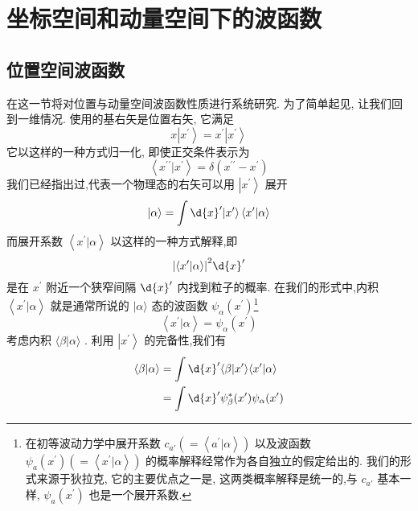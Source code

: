 \documentclass[lang=cn,newtx,10pt,scheme=chinese,thmcnt=section]{elegantbook}
\begin{document}
\section{坐标空间和动量空间下的波函数}
\subsection*{位置空间波函数}
在这一节将对位置与动量空间波函数性质进行系统研究. 为了简单起见, 让我们回到一维情况. 使用的基右矢是位置右矢, 它满足
\begin{equation}
	x\left| {x}^{\prime }\right\rangle = {x}^{\prime }\left| {x}^{\prime }\right\rangle
\end{equation}
它以这样的一种方式归一化, 即使正交条件表示为
\begin{equation}
	\left\langle {{x}^{\prime \prime } | {x}^{\prime }}\right\rangle = \delta \left( {{x}^{\prime \prime } - {x}^{\prime }}\right)
\end{equation}
我们已经指出过,代表一个物理态的右矢可以用 $\left| {x}^{\prime }\right\rangle$ 展开
\begin{equation}
	| {\alpha \rangle = \int \d{x}^{\prime }}| {x}^{\prime }\rangle \left\langle {{x}^{\prime } | \alpha }\right\rangle
\end{equation}
而展开系数 $\left\langle {{x}^{\prime } | \alpha }\right\rangle$ 以这样的一种方式解释,即
\begin{equation}
	{\left| \left\langle {x}^{\prime } | \alpha \right\rangle \right| }^{2}\d{x}^{\prime }
\end{equation}
是在 ${x}^{\prime }$ 附近一个狭窄间隔 $\d{x}^{\prime }$ 内找到粒子的概率. 在我们的形式中,内积 $\left\langle {{x}^{\prime } | \alpha }\right\rangle$ 就是通常所说的 $|\alpha \rangle$ 态的波函数 ${\psi }_{\alpha }\left( {x}^{\prime }\right)$\footnote{在初等波动力学中展开系数 ${c}_{a'}\left( { = \left\langle {{a}^{\prime } | \alpha }\right\rangle }\right)$ 以及波函数 ${\psi }_{a}\left( {x}^{\prime }\right) \left( { = \left\langle {{x}^{\prime } | \alpha }\right\rangle }\right)$ 的概率解释经常作为各自独立的假定给出的. 我们的形式来源于狄拉克, 它的主要优点之一是, 这两类概率解释是统一的,与 ${c}_{a'}$ 基本一样, ${\psi }_{a}\left( {x}^{\prime }\right)$ 也是一个展开系数.}
\begin{equation}
	\left\langle {{x}^{\prime } | \alpha }\right\rangle = {\psi }_{\alpha }\left( {x}^{\prime }\right)
\end{equation}
考虑内积 $\langle \beta | \alpha \rangle$ . 利用 $\left| {x}^{\prime }\right\rangle$ 的完备性,我们有
\begin{equation}
	\begin{aligned}
		\langle \beta | \alpha \rangle &= \int \d{x}^{\prime }\langle {\beta | {{x}^{\prime }\rangle \langle {{x}^{\prime } | \alpha }\rangle } }\\
		&= \int \d{x}^{\prime }{\psi }_{\beta }^{ * }( {x}^{\prime }) {\psi }_{\alpha }( {x}^{\prime })
	\end{aligned}
\end{equation}
\end{document}
